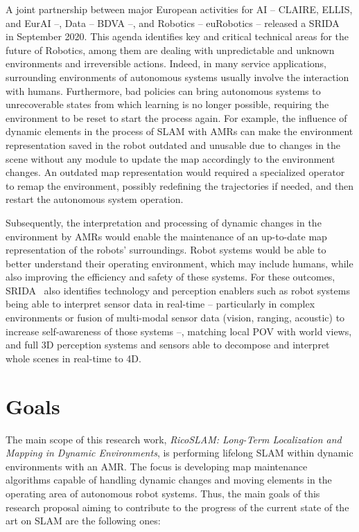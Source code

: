 A joint partnership between major European activities for \gls{AI} -- \gls{CLAIRE}, \gls{ELLIS}, and \gls{EurAI} --, Data -- \gls{BDVA} --, and Robotics -- \gls{euRobotics} -- released a \gls{SRIDA}~\cite{srida:strategic-agenda} in September 2020.
This agenda identifies key and critical technical areas for the future of Robotics, among them are dealing with unpredictable and unknown environments and irreversible actions. 
Indeed, in many service applications, surrounding environments of autonomous systems usually involve the interaction with humans. Furthermore, bad policies can bring autonomous systems to unrecoverable states from which learning is no longer possible, requiring the environment to be reset to start the process again.
For example, the influence of dynamic elements in the process of \gls{SLAM} with \glspl{AMR} can make the environment representation saved in the robot outdated and unusable due to changes in the scene without any module to update the map accordingly to the environment changes. An outdated map representation would required a specialized operator to remap the environment, possibly redefining the trajectories if needed, and then restart the autonomous system operation.

Subsequently, the interpretation and processing of dynamic changes in the environment by \glspl{AMR} would enable the maintenance of an up-to-date map representation of the robots' surroundings.
Robot systems would be able to better understand their operating environment, which may include humans, while also improving the efficiency and safety of these systems.
For these outcomes, \gls{SRIDA}~\cite{srida:strategic-agenda} also identifies technology and perception enablers such as robot systems being able to interpret sensor data in real-time -- particularly in complex environments or fusion of multi-modal sensor data (vision, ranging, acoustic) to increase self-awareness of those systems --, matching local \gls{POV} with world views, and full 3D perception systems and sensors able to decompose and interpret whole scenes in real-time to 4D.






\section{Goals}\label{sec:goals}

The main scope of this research work, \textit{RicoSLAM: Long-Term Localization and Mapping in Dynamic Environments}, is performing lifelong \gls{SLAM} within dynamic environments with an \gls{AMR}.
The focus is developing map maintenance algorithms capable of handling dynamic changes and moving elements in the operating area of autonomous robot systems.
Thus, the main goals of this research proposal aiming to contribute to the progress of the current state of the art on \gls{SLAM} are the following ones:

